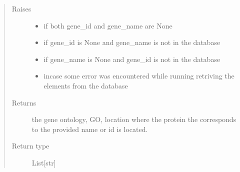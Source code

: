\documentclass[letterpaper,10pt,english]{sphinxmanual}
\begin{document}
\begin{fulllineitems}
\begin{fulllineitems}
\begin{quote}
\begin{description}
\begin{itemize}
\end{itemize}

\item[{Raises}] \leavevmode\begin{itemize}
\item {} 
 \textendash{} if both gene\_id and gene\_name are None

\item {} 
 \textendash{} if gene\_id is None and gene\_name is not in the database

\item {} 
 \textendash{} if gene\_name is None and gene\_id is not in the database

\item {} 
 \textendash{} incase some error was encountered while running retriving the elements from the database

\end{itemize}

\item[{Returns}] \leavevmode
the gene ontology, GO,  location where the protein the corresponds to the provided name or id is located.

\item[{Return type}] \leavevmode
List{[}str{]}

\end{description}\end{quote}

\end{fulllineitems}



\end{fulllineitems}
\end{document}
